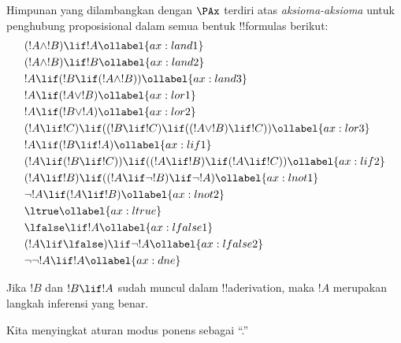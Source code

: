 \documentclass[../../../include/open-logic-section]{subfiles}
\begin{document}
      {}
      {}


\begin{defn}[Aksioma]
Himpunan yang dilambangkan dengan $\PAx$ terdiri atas
\emph{aksioma-aksioma} untuk penghubung proposisional dalam semua
bentuk !!{formula}s berikut:
\begin{align}
  & (!A \land !B) \lif !A \ollabel{ax:land1}\\
  & (!A \land !B) \lif !B \ollabel{ax:land2}\\
  & !A \lif (!B \lif (!A \land !B)) \ollabel{ax:land3}\\
  & !A \lif (!A \lor !B) \ollabel{ax:lor1}\\
  & !A \lif (!B \lor !A) \ollabel{ax:lor2}\\
  & (!A \lif !C) \lif ((!B \lif !C) \lif ((!A \lor !B) \lif !C)) \ollabel{ax:lor3}\\
  & !A \lif (!B \lif !A) \ollabel{ax:lif1}\\
  & (!A \lif (!B \lif !C)) \lif ((!A \lif !B) \lif (!A \lif !C)) \ollabel{ax:lif2}\\
  & (!A \lif !B) \lif ((!A \lif \lnot !B) \lif \lnot !A) \ollabel{ax:lnot1}\\
  & \lnot !A \lif (!A \lif !B) \ollabel{ax:lnot2}\\
  & \ltrue \ollabel{ax:ltrue}\\
  & \lfalse \lif !A \ollabel{ax:lfalse1}\\
  & (!A \lif \lfalse) \lif \lnot !A \ollabel{ax:lfalse2}\\
  & \lnot\lnot !A \lif !A \ollabel{ax:dne}
\end{align}
\end{defn}

\begin{defn}
  Jika $!B$ dan $!B \lif !A$ sudah muncul dalam !!a{derivation}, maka
  $!A$ merupakan langkah inferensi yang benar.
\end{defn}

Kita menyingkat aturan modus ponens sebagai ``\MP.''
\end{document}
